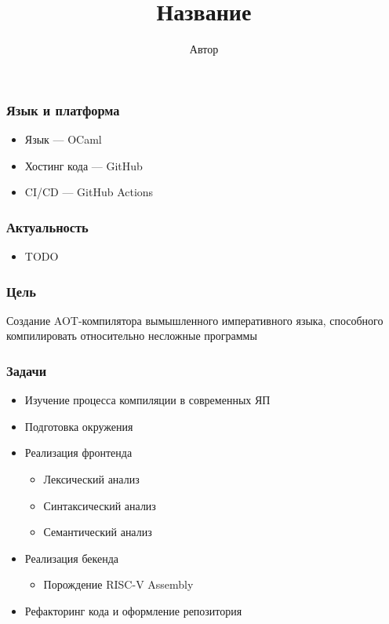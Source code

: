 \documentclass{beamer}
\title{Название}
\author{Автор}
\begin{document}
	
	\begin{frame}[plain]
		\maketitle
	\end{frame}
	
	\begin{frame}
	\frametitle{Язык и платформа}
	\begin{itemize}
			\item Язык — OCaml
			\item Хостинг кода — GitHub
			\item CI/CD — GitHub Actions
		\end{itemize}
	\end{frame}
	
	\begin{frame}
		\frametitle{Актуальность}
		\begin{itemize}
			\item TODO
		\end{itemize}
	\end{frame}
	
	\begin{frame}
		\frametitle{Цель}
		Создание AOT-компилятора вымышленного императивного языка, способного компилировать относительно несложные программы 
	\end{frame}
	
	\begin{frame}
		\frametitle{Задачи}
		\begin{itemize}
			\item Изучение процесса компиляции в современных ЯП
			\item Подготовка окружения
			\item Реализация фронтенда
			\begin{itemize}
				\item Лексический анализ
				\item Синтаксический анализ
				\item Семантический анализ
			\end{itemize}
			\item Реализация бекенда
			\begin{itemize}
				\item Порождение RISC-V Assembly
			\end{itemize}
			\item Рефакторинг кода и оформление репозитория
		\end{itemize}
	\end{frame}
	
\end{document}
